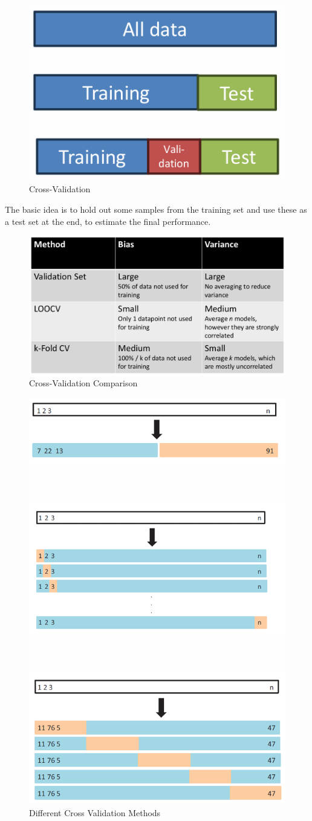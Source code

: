 \documentclass[../Main.tex]{subfiles}
\begin{document}
\begin{figure}[H]
    \centering
    \includegraphics[width=0.25\linewidth]{Images/cross-validation.png}
    \caption{Cross-Validation}
\end{figure}

The basic idea is to hold out some samples from the 
training set and use these as a test set at the end, to 
estimate the final performance.

\begin{figure}[H]
    \centering
    \includegraphics[width=0.75\linewidth]{Images/cross-val-comparison.png}
    \caption{Cross-Validation Comparison}
\end{figure}

\begin{figure}[H]
    \centering
    \includegraphics[width=0.5\linewidth]{Images/different-cross-validation-methods.png}
    \caption{Different Cross Validation Methods}
\end{figure}
\end{document}
